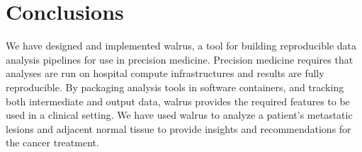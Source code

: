 \section{Conclusions} 
We have designed and implemented walrus, a tool for building reproducible data
analysis pipelines for use in precision medicine. Precision medicine requires
that analyses are run on hospital compute infrastructures and results are fully
reproducible.  By packaging analysis tools in software containers, and tracking
both intermediate and output data, walrus provides the required features to be
used in a clinical setting. 
We have used walrus to analyze a patient's metastatic lesions and adjacent
normal tissue to provide insights and recommendations for the cancer treatment. 


